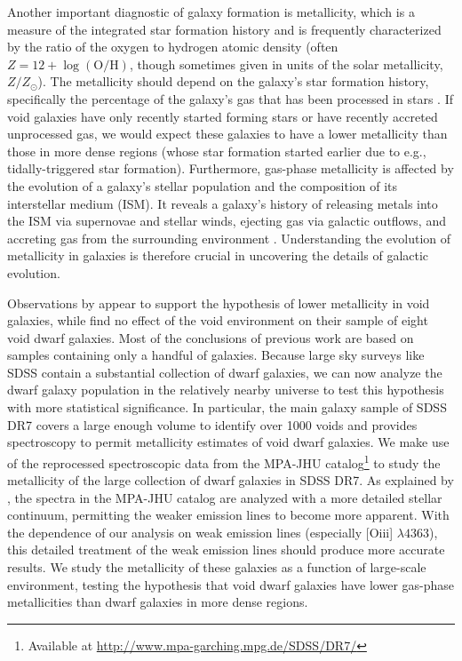 Another important diagnostic of galaxy formation is metallicity, which is a 
measure of the integrated star formation history and is frequently characterized 
by the ratio of the oxygen to hydrogen atomic density (often 
$Z = 12 + \log (\text{O}/\text{H})$, though sometimes given in units of the 
solar metallicity, $Z/Z_{\odot}$).  The metallicity should depend on the 
galaxy's star formation history, specifically the percentage of the galaxy's gas 
that has been processed in stars \citep{Guseva09}.  If void galaxies have only 
recently started forming stars or have recently accreted unprocessed gas, we 
would expect these galaxies to have a lower metallicity than those in more dense 
regions (whose star formation started earlier due to e.g., tidally-triggered 
star formation).  Furthermore, gas-phase metallicity is affected by the 
evolution of a galaxy's stellar population and the composition of its 
interstellar medium (ISM).  It reveals a galaxy's history of releasing metals 
into the ISM via supernovae and stellar winds, ejecting gas via galactic 
outflows, and accreting gas from the surrounding environment 
\citep[see, e.g.,][and references therein]{Cooper08,Cybulski14,Hirschmann14}.  
Understanding the evolution of metallicity in galaxies is therefore crucial in 
uncovering the details of galactic evolution.


Observations by \cite{Cooper08, Deng11, Filho15, Pustilnik06, Pustilnik11a, 
Pustilnik11b, Pustilnik13, Pustilnik14} appear to support the hypothesis of 
lower metallicity in void galaxies, while \cite{Kreckel15} find no effect of the 
void environment on their sample of eight void dwarf galaxies.  Most of the 
conclusions of previous work are based on samples containing only a handful of 
galaxies.  Because large sky surveys like SDSS contain a substantial collection 
of dwarf galaxies, we can now analyze the dwarf galaxy population in the 
relatively nearby universe to test this hypothesis with more statistical 
significance.  In particular, the main galaxy sample of SDSS DR7 covers a large 
enough volume to identify over 1000 voids \citep{Pan12} and provides 
spectroscopy to permit metallicity estimates of void dwarf galaxies.  We make 
use of the reprocessed spectroscopic data from the MPA-JHU 
catalog\footnote{Available at \url{http://www.mpa-garching.mpg.de/SDSS/DR7/}} to 
study the metallicity of the large collection of dwarf galaxies in SDSS DR7.  As 
explained by \cite{Tremonti04}, the spectra in the MPA-JHU catalog are analyzed 
with a more detailed stellar continuum, permitting the weaker emission lines to 
become more apparent.  With the dependence of our analysis on weak emission 
lines (especially [O{\sc iii}] $\lambda 4363$), this detailed treatment of the 
weak emission lines should produce more accurate results.  We study the 
metallicity of these galaxies as a function of large-scale environment, testing 
the hypothesis that void dwarf galaxies have lower gas-phase metallicities than 
dwarf galaxies in more dense regions.

